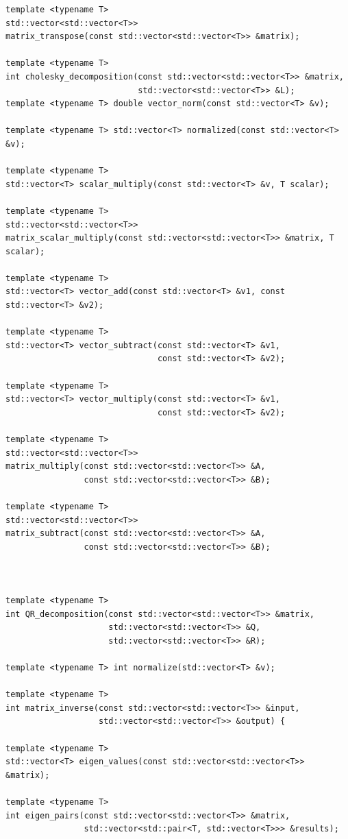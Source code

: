 \documentclass[zavrsnirad]{fer}
\begin{document}
\begin{lstlisting}[caption={Metode implementirane u matematičkom okviru}, label={lst:cpp_example}]
template <typename T>
std::vector<std::vector<T>>
matrix_transpose(const std::vector<std::vector<T>> &matrix);

template <typename T>
int cholesky_decomposition(const std::vector<std::vector<T>> &matrix,
                           std::vector<std::vector<T>> &L);
template <typename T> double vector_norm(const std::vector<T> &v);

template <typename T> std::vector<T> normalized(const std::vector<T> &v);

template <typename T>
std::vector<T> scalar_multiply(const std::vector<T> &v, T scalar);

template <typename T>
std::vector<std::vector<T>>
matrix_scalar_multiply(const std::vector<std::vector<T>> &matrix, T scalar);

template <typename T>
std::vector<T> vector_add(const std::vector<T> &v1, const std::vector<T> &v2);

template <typename T>
std::vector<T> vector_subtract(const std::vector<T> &v1,
                               const std::vector<T> &v2);

template <typename T>
std::vector<T> vector_multiply(const std::vector<T> &v1,
                               const std::vector<T> &v2);

template <typename T>
std::vector<std::vector<T>>
matrix_multiply(const std::vector<std::vector<T>> &A,
                const std::vector<std::vector<T>> &B);

template <typename T>
std::vector<std::vector<T>>
matrix_subtract(const std::vector<std::vector<T>> &A,
                const std::vector<std::vector<T>> &B);



template <typename T>
int QR_decomposition(const std::vector<std::vector<T>> &matrix,
                     std::vector<std::vector<T>> &Q,
                     std::vector<std::vector<T>> &R);

template <typename T> int normalize(std::vector<T> &v);

template <typename T>
int matrix_inverse(const std::vector<std::vector<T>> &input,
                   std::vector<std::vector<T>> &output) {

template <typename T>
std::vector<T> eigen_values(const std::vector<std::vector<T>> &matrix);

template <typename T>
int eigen_pairs(const std::vector<std::vector<T>> &matrix,
                std::vector<std::pair<T, std::vector<T>>> &results);
\end{lstlisting}
\end{document}
